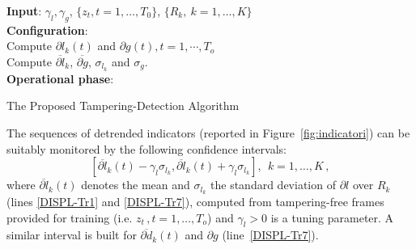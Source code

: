 \documentclass{llncs}
\begin{document}
\begin{algorithm}[t]
	\LinesNumbered
	\textbf{Input}: $\gamma_l, \gamma_g$, $\{z_t, t = 1, \dots, T_{0}\}$, $\{R_k, \ k=1,\dots,K\}$ \\
	\textbf{Configuration}:\\
	 Compute $\partial l_k(t)$ and $\partial g(t), t = 1, \cdots, T_o$\\ 
	 Compute $\overline{\partial l}_k$, $\overline{\partial g}$, $\sigma_{l_k}$ and $\sigma_{g}$.\\
	
	\textbf{Operational phase}:\\
	    
	\caption{The Proposed Tampering-Detection Algorithm}
	\label{alg:DISPL}
\end{algorithm}

The sequences of detrended indicators (reported in Figure~\ref{fig:indicatori}) can be suitably monitored by the following confidence intervals:
\begin{equation}\label{eq:confidenceRegions}
 [\overline{\partial l}_k(t) - \gamma_l \sigma_{l_k}, \overline{\partial l}_k(t) + \gamma_l \sigma_{l_k}], \ \  k = 1,\dots,K\,,
\end{equation}
where $\overline{\partial l}_k(t)$ denotes the mean and $\sigma_{l_k}$ the standard deviation of $\partial l$ over $R_k$ (lines \ref{DISPL-Tr1} and \ref{DISPL-Tr7}), computed from tampering-free frames provided for training (i.e. $z_t\,, t = 1, \dots, T_o$) and $\gamma_l >0$ is a tuning parameter. A similar interval is built for  $\overline{\partial d}_k(t)$ and $\partial g$ (line~\ref{DISPL-Tr7}). 
\end{document}
